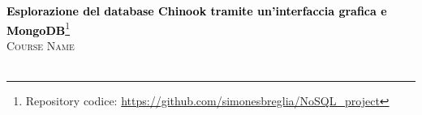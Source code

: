 \begin{titlepage}
    \selectfont 

    \vspace*{3cm}
    
    \centering
    {\Huge \textbf{\textcolor{black}{Esplorazione del database Chinook tramite un'interfaccia grafica e MongoDB}}}\footnote{Repository codice: \url{https://github.com/simonesbreglia/NoSQL\_project}}\\[1.5cm]
    \textsc{\LARGE Course Name}\\[0.5cm]
    \\[2cm]
    

\end{titlepage}
